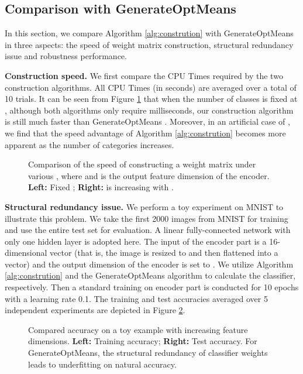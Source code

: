 \documentclass[preprint,review,12pt]{elsarticle}
\numberwithin{equation}{section}
\begin{document}
\subsection{Comparison with GenerateOptMeans}
\label{experiment:redundancy}
In this section, we compare Algorithm \ref{alg:constrution} with GenerateOptMeans  \cite{pang2020} in three aspects:
the speed of weight matrix construction,  structural redundancy issue and robustness performance.

\textbf{Construction speed.} We first compare the CPU Times required by the two construction algorithms.
All CPU Times (in seconds) are averaged over a total of 10 trials.
It can be seen from Figure \ref{fig-genTime} that when the number of classes is fixed at ,
although both algorithms only require milliseconds, our construction algorithm is still much faster than GenerateOptMeans \cite{pang2020}.
Moreover, in an artificial case of ,
we find that the speed advantage of Algorithm \ref{alg:constrution} becomes more apparent as the number of categories increases.



\begin{figure}[htb]
	\centering
	\caption{
	Comparison of the  speed of constructing a weight matrix  under various ,
    where  and  is the output feature dimension of the encoder.
	\textbf{Left:}  Fixed ;
	\textbf{Right:}  is increasing with .
	}
	\label{fig-genTime}
\end{figure}

\textbf{Structural redundancy issue.} We perform a toy experiment on MNIST to illustrate this problem.
We take the first 2000 images from MNIST for training and use the entire test set for evaluation.
A linear fully-connected network with only one hidden layer is adopted here.
The input of the encoder part is a 16-dimensional vector (that is, the image is resized to  and then flattened into a vector)
and the output dimension of the encoder is set to .
We utilize Algorithm \ref{alg:constrution} and the GenerateOptMeans algorithm \cite{pang2018}
to calculate the classifier, respectively.
Then a standard training  on encoder part is conducted for 10 epochs with a learning rate 0.1.
The training and test accuracies averaged over 5 independent experiments are depicted  in Figure \ref{STRed}.

\begin{figure}[htb]
	\centering
	\caption{Compared accuracy on a toy example with increasing feature dimensions.
                 \textbf{Left:} Training accuracy; \textbf{Right:} Test accuracy.
                 For GenerateOptMeans, the structural redundancy of classifier weights leads to underfitting on natural accuracy.
              }
	\label{STRed}
\end{figure}
\end{document}
